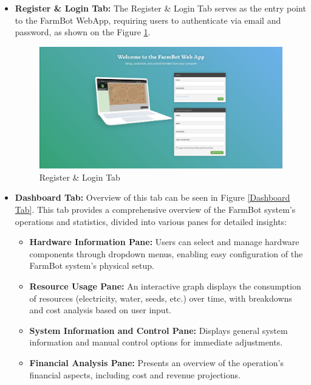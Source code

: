 \begin{itemize}
    \item \textbf{Register \& Login Tab:} The Register \& Login Tab serves as the entry point to the FarmBot WebApp, requiring users to authenticate via email and password, as shown on the Figure \ref{Register Login Tab}.\\

    \begin{figure}[htbp]
        \centering
        \includegraphics[width=1\linewidth]{Figures/register_login_tab.png}
        \caption{Register \& Login Tab}
        \label{Register Login Tab}
    \end{figure}
    
    \item \textbf{Dashboard Tab:} Overview of this tab can be seen in Figure \ref{Dashboard Tab}. This tab provides a comprehensive overview of the FarmBot system's operations and statistics, divided into various panes for detailed insights:
    \begin{itemize}
        \item \textbf{Hardware Information Pane:} Users can select and manage hardware components through dropdown menus, enabling easy configuration of the FarmBot system's physical setup.
        \item \textbf{Resource Usage Pane:} An interactive graph displays the consumption of resources (electricity, water, seeds, etc.) over time, with breakdowns and cost analysis based on user input.
        \item \textbf{System Information and Control Pane:} Displays general system information and manual control options for immediate adjustments.
        \item \textbf{Financial Analysis Pane:} Presents an overview of the operation's financial aspects, including cost and revenue projections.
    \end{itemize}
 

\end{itemize}
